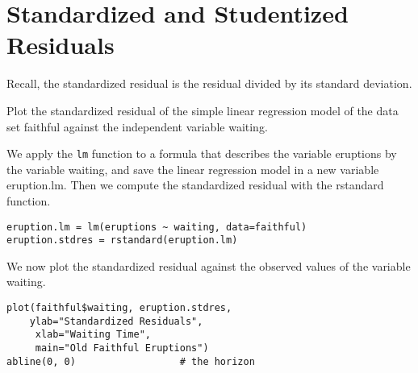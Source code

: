 \documentclass[residuals.tex]{subfiles}
\begin{document}

\newpage
\section{Standardized and Studentized Residuals}
Recall, the standardized residual is the residual divided by its standard deviation. 
 
Plot the standardized residual of the simple linear regression model of the data set faithful against the independent variable waiting.

We apply the \texttt{lm} function to a formula that describes the variable eruptions by the variable waiting, and save the linear regression model in a new variable eruption.lm. Then we compute the standardized residual with the rstandard function.

\begin{framed}
\begin{verbatim}
eruption.lm = lm(eruptions ~ waiting, data=faithful) 
eruption.stdres = rstandard(eruption.lm) 
\end{verbatim}
\end{framed}
We now plot the standardized residual against the observed values of the variable waiting.
\begin{framed}
\begin{verbatim}
plot(faithful$waiting, eruption.stdres, 
    ylab="Standardized Residuals", 
     xlab="Waiting Time", 
     main="Old Faithful Eruptions") 
abline(0, 0)                  # the horizon
\end{verbatim}
\end{framed}
\end{document}

